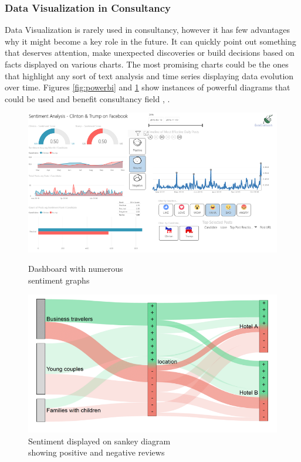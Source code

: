 \documentclass{article}
\begin{document}
\subsubsection{Data Visualization in Consultancy}

{\large
Data Visualization is rarely used in consultancy, however it has few advantages why it might become a key role in the future. It can quickly point out something that deserves attention, make unexpected discoveries or build decisions based on facts displayed on various charts. The most promising charts could be the ones that highlight any sort of text analysis and time series displaying data evolution over time. Figures \ref{fig:powerbi} and \ref{fig:sankey} show instances of powerful diagrams that could be used and benefit consultancy field \parencite{sankey}, \parencite{powerbi}.\par
}

\begin{figure}[H]
\centering
\begin{minipage}{.5\textwidth}
  \centering
  \includegraphics[width=0.97\linewidth]{img/consultancycharts.png}
  \caption[Sentiment analysis displayed on numerous graphs]
    {Dashboard with numerous \\ sentiment graphs \endtabular}
  \label{fig:powerbi}
\end{minipage}%
\begin{minipage}{.5\textwidth}
  \centering
  \includegraphics[width=0.97\linewidth]{img/sankeychart.png}
  \caption[Sentiment displayed on sankey diagram]
  {Sentiment displayed on sankey diagram \\ showing positive and negative reviews\endtabular}
  \label{fig:sankey}
\end{minipage}
\end{figure}
\end{document}
